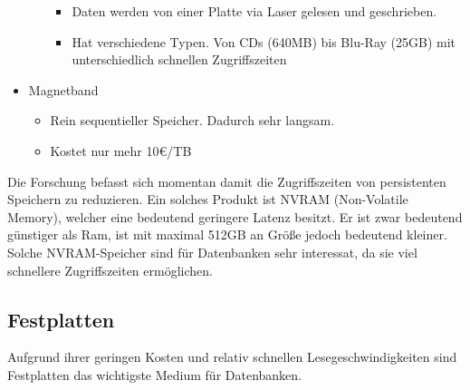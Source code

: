 \documentclass{article}
\begin{document}
\begin{itemize}
\begin{itemize}
\begin{itemize}
				\item{Daten werden von einer Platte via Laser gelesen und geschrieben.}
				\item{Hat verschiedene Typen. Von CDs (640MB) bis Blu-Ray (25GB) mit unterschiedlich schnellen Zugriffszeiten}
			\end{itemize}
		\end{itemize}
		\item{Magnetband}
		\begin{itemize}
			\item{Rein sequentieller Speicher. Dadurch sehr langsam.}
			\item{Kostet nur mehr 10€/TB}
		\end{itemize}
	\end{itemize}
	Die Forschung befasst sich momentan damit die Zugriffszeiten von persistenten Speichern zu reduzieren. Ein solches Produkt ist NVRAM (Non-Volatile Memory), welcher eine bedeutend geringere Latenz besitzt. Er ist zwar bedeutend günstiger als Ram, ist mit maximal 512GB an Größe jedoch bedeutend kleiner. Solche NVRAM-Speicher sind für Datenbanken sehr interessat, da sie viel schnellere Zugriffszeiten ermöglichen. \\
	\subsection{Festplatten}
	Aufgrund ihrer geringen Kosten und relativ schnellen Lesegeschwindigkeiten sind Festplatten das wichtigste Medium für Datenbanken.
\end{document}
